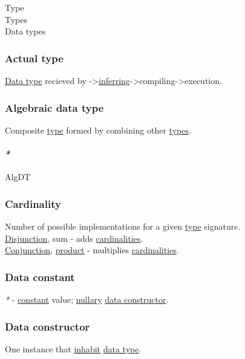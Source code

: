 \documentclass[11pt]{article}
\begin{document}
\label{orgc4aea2f}Type\\
\label{org4209edd}Types\\
\label{org5c444ae}Data types\\

\subsubsection{\label{org9319831}Actual type}
\label{sec:org574992f}
\hyperref[org212d9c3]{Data type} recieved by ->\hyperref[org6183920]{inferring}->compiling->execution.\\

\subsubsection{\label{org2278a14}Algebraic data type}
\label{sec:org0a85130}
Composite \hyperref[orgc4aea2f]{type} formed by combining other \hyperref[org4209edd]{types}.\\

\paragraph{\emph{*}}
\label{sec:orgfee2dbd}

\label{orgcd920b5}AlgDT\\

\subsubsection{\label{org2c20526}Cardinality}
\label{sec:orgdd925e1}
Number of possible implementations for a given \hyperref[orgc4aea2f]{type} signature.\\

\hyperref[org3588607]{Disjunction}, sum - adds \hyperref[org55a87c3]{cardinalities}.\\
\hyperref[orgc8fbabd]{Conjunction}, \hyperref[org80a0b6e]{product} - multiplies \hyperref[org55a87c3]{cardinalities}.\\

\subsubsection{\label{org31b6036}Data constant}
\label{sec:org981fc51}
\emph{*} - \hyperref[org74b57ec]{constant} value; \hyperref[org2fb9b13]{nullary} \hyperref[org1fbdcfd]{data constructor}.\\

\subsubsection{\label{org1fbdcfd}Data constructor}
\label{sec:org6c8217e}
One instance that \hyperref[orge1ae7f8]{inhabit} \hyperref[org212d9c3]{data type}.\\
\end{document}
